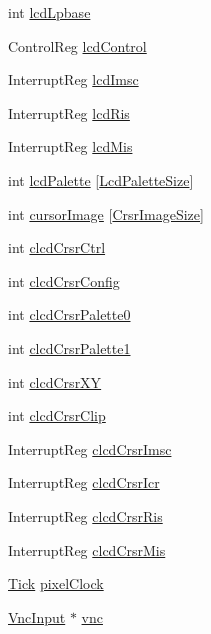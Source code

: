 \begin{DoxyCompactItemize}
int \hyperlink{classPl111_a91e93048dd9730130b9e92e4bea15df0}{lcdLpbase}
\item 
ControlReg \hyperlink{classPl111_a1de39f0f15daf9c8b37e47458498b609}{lcdControl}
\item 
InterruptReg \hyperlink{classPl111_aa5af63833428e4bb947a5f10bab4d043}{lcdImsc}
\item 
InterruptReg \hyperlink{classPl111_a977905b70318298f359957fea2723d97}{lcdRis}
\item 
InterruptReg \hyperlink{classPl111_a7410dd40533dc165663f9deda4c36683}{lcdMis}
\item 
int \hyperlink{classPl111_ae214882030fa17459f741e5b0afc2b12}{lcdPalette} \mbox{[}\hyperlink{classPl111_a12008db88a2d42b82d27aa2de179af45}{LcdPaletteSize}\mbox{]}
\item 
int \hyperlink{classPl111_a739d82d37ea9d8bad535431ceee721d6}{cursorImage} \mbox{[}\hyperlink{classPl111_aa41c0581029a0907bf48839070059c66}{CrsrImageSize}\mbox{]}
\item 
int \hyperlink{classPl111_af1aa35ccaa11f11271ede1e39c64c3ad}{clcdCrsrCtrl}
\item 
int \hyperlink{classPl111_a60838816fc4cc7e898042259f9eec917}{clcdCrsrConfig}
\item 
int \hyperlink{classPl111_a8b6f78d34ea5c7859df6b9b42301ceff}{clcdCrsrPalette0}
\item 
int \hyperlink{classPl111_a5705f1065367bfed27b41d67082286b8}{clcdCrsrPalette1}
\item 
int \hyperlink{classPl111_a73bc81eb6530a013ff4c19a1e3c82ec8}{clcdCrsrXY}
\item 
int \hyperlink{classPl111_a502477050a99c8f88ead81a5c0c0b5de}{clcdCrsrClip}
\item 
InterruptReg \hyperlink{classPl111_a01cb42930c185c8596117390d75f7441}{clcdCrsrImsc}
\item 
InterruptReg \hyperlink{classPl111_a29b7b61cdbcee532d282c29504a725c8}{clcdCrsrIcr}
\item 
InterruptReg \hyperlink{classPl111_a63a1037985c9e525a4adf69e4d593b85}{clcdCrsrRis}
\item 
InterruptReg \hyperlink{classPl111_aefc053082c6ee9380baa297b80e4ec16}{clcdCrsrMis}
\item 
\hyperlink{base_2types_8hh_a5c8ed81b7d238c9083e1037ba6d61643}{Tick} \hyperlink{classPl111_a417073569da6863481ba6470ffc11857}{pixelClock}
\item 
\hyperlink{classVncInput}{VncInput} $\ast$ \hyperlink{classPl111_a52d1b5d3426a30e18a452cd67d87ec13}{vnc}
\item 

\end{DoxyCompactItemize}
